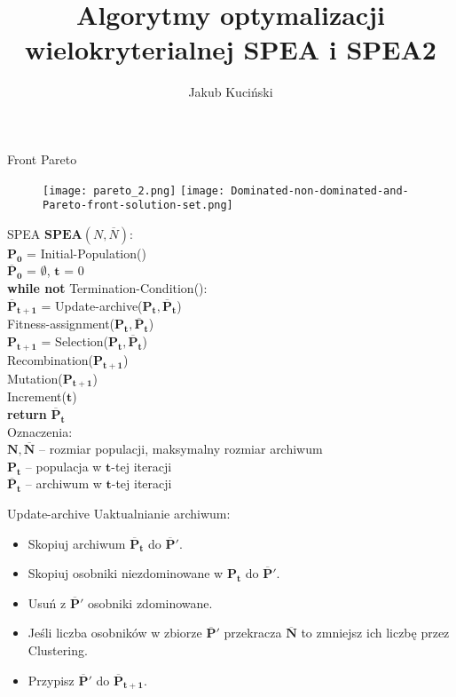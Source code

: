 \documentclass{beamer}
\title[SPEA, SPEA2]{Algorytmy optymalizacji wielokryterialnej \newline SPEA i SPEA2}
\author[Jakub Kuciński]{Jakub Kuciński}
\date{\displaydate{date}}
\begin{document}
\frame{\titlepage}


\begin{frame}{Front Pareto}
\begin{figure}[htp]
    \centering
    \texttt{[image: pareto\_2.png]}
    \texttt{[image: Dominated-non-dominated-and-Pareto-front-solution-set.png]}
\end{figure}
\end{frame}


\begin{frame}{SPEA}
$\boldsymbol{SPEA}(N,\overline{N})$:\smallskip\\
$\boldsymbol{P_0}$ = Initial-Population()\\
$\boldsymbol{\overline{P}_0}$ = $\emptyset$, $\boldsymbol{t}$ = 0\\
\textbf{while not} Termination-Condition():\\
\quad \quad $\boldsymbol{\overline{P}_{t+1}}$ = Update-archive($\boldsymbol{P_t}, \boldsymbol{\overline{P}_t}$)\\
\quad \quad Fitness-assignment($\boldsymbol{P_t}, \boldsymbol{\overline{P}_t}$) \\
\quad \quad $\boldsymbol{{P}_{t+1}}$ = Selection($\boldsymbol{P_t}, \boldsymbol{\overline{P}_t}$)\\
\quad \quad Recombination($\boldsymbol{{P}_{t+1}}$)\\
\quad \quad Mutation($\boldsymbol{{P}_{t+1}}$)\\
\quad \quad Increment($\boldsymbol{t}$)\\
\textbf{return} $\boldsymbol{\overline{P}_t}$\\
\bigskip
Oznaczenia:\\
$\boldsymbol{N,\overline{N}}$ -- rozmiar populacji, maksymalny rozmiar archiwum\\
$\boldsymbol{{P}_t}$ -- populacja w $\boldsymbol{t}$-tej iteracji\\
$\boldsymbol{\overline{P}_t}$ -- archiwum w $\boldsymbol{t}$-tej iteracji\\
\end{frame}


\begin{frame}{Update-archive}
Uaktualnianie archiwum:
\begin{itemize}
    \item Skopiuj archiwum $\boldsymbol{\overline{P}_t}$ do $\boldsymbol{\overline{P}'}$.
    \item Skopiuj osobniki niezdominowane w $\boldsymbol{{P}_t}$ do $\boldsymbol{\overline{P}'}$.
    \item Usuń z $\boldsymbol{\overline{P}'}$ osobniki zdominowane.
    \item Jeśli liczba osobników w zbiorze $\boldsymbol{\overline{P}'}$ przekracza $\boldsymbol{\overline{N}}$ to zmniejsz ich liczbę przez Clustering.
    \item Przypisz $\boldsymbol{\overline{P}'}$ do $\boldsymbol{\overline{P}_{t+1}}$.
\end{itemize}
\end{frame}
\end{document}
